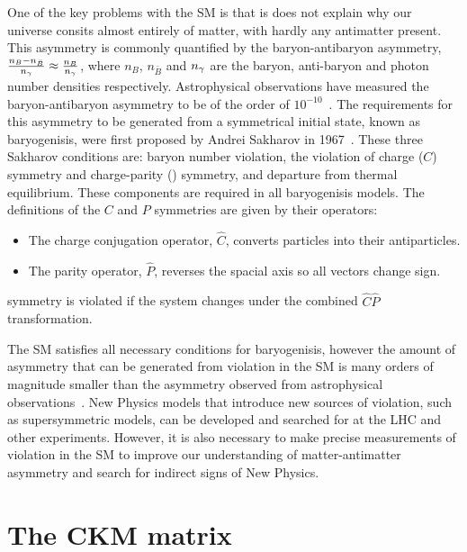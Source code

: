 One of the key problems with the SM is that is does not explain why our universe consits almost entirely of matter, with hardly any antimatter present. This asymmetry is commonly quantified by the baryon-antibaryon asymmetry, $\frac{n_{B} - n_{\bar{B}}}{n_{{\gamma}}} \approx \frac{n_{B}}{n_{{\gamma}}}$, where $n_{B}$, $n_{\bar{B}}$ and $n_{{\gamma}}$ are the baryon, anti-baryon and photon number densities respectively. Astrophysical observations have measured the baryon-antibaryon asymmetry to be of the order of $10^{-10}$~\cite{astrophysicalasy}. The requirements for this asymmetry to be generated from a symmetrical initial state, known as baryogenisis, were first proposed by Andrei Sakharov in 1967~\cite{sakharov}. These three Sakharov conditions are: baryon number violation, the violation of charge ($C$) symmetry and charge-parity (\CP) symmetry, and departure from thermal equilibrium. These components are required in all baryogenisis models. The definitions of the $C$ and $P$ symmetries are given by their operators:
\begin{itemize}
\item The charge conjugation operator, $\hat{C}$, converts particles into their antiparticles.
\item The parity operator, $\hat{P}$, reverses the spacial axis so all vectors change sign.
\end{itemize}
\CP symmetry is violated if the system changes under the combined $\hat{C}\hat{P}$ transformation.

The SM satisfies all necessary conditions for baryogenisis, however the amount of asymmetry that can be generated from \CP violation in the SM is many orders of magnitude smaller than the asymmetry observed from astrophysical observations~\cite{SMasy}. New Physics models that introduce new sources of \CP violation{\color{red}{[ref]}}, such as supersymmetric models, can be developed and searched for at the LHC and other experiments. However, it is also necessary to make precise measurements of \CP violation in the SM to improve our understanding of matter-antimatter asymmetry and search for indirect signs of New Physics.


\section{The CKM matrix}

